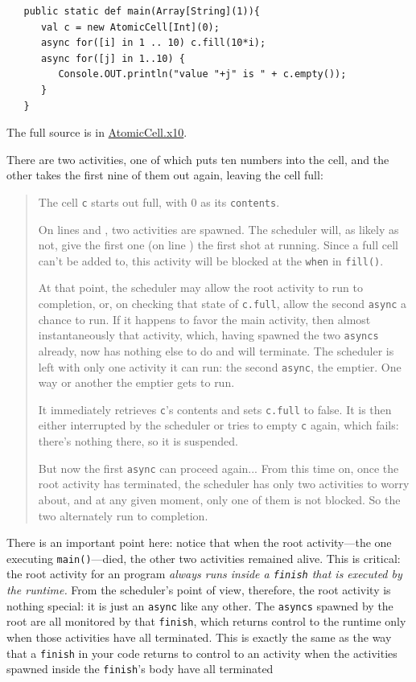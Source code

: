 \begin{verbatim}
   public static def main(Array[String](1)){
      val c = new AtomicCell[Int](0);
      async for([i] in 1 .. 10) c.fill(10*i);
      async for([j] in 1..10) {
         Console.OUT.println("value "+j" is " + c.empty());
      }
   }
\end{verbatim}

The full source is in
\href{src/concurrency/AtomicCell.x10}{AtomicCell.x10}.

There are two activities, one of
which puts ten numbers into the cell, and the other takes the first nine of
them out again, leaving the cell full:

\begin{quote}
The cell {\tt c} starts out full, with 0 as its {\tt contents}.

On lines  and  , two activities
are spawned.  The scheduler will, as likely as not, give the first one
(on line  ) the first shot at running.
Since a full cell can't be added to, this activity will be blocked at the
{\tt when} in {\tt fill()}.  

At that point, the scheduler may allow the root activity to run to completion,
or, on checking that state of {\tt c.full}, allow the second {\tt async}  a chance
to run.   If it happens to favor the main activity, then almost instantaneously
that activity, which, having spawned the two {\tt asyncs} already, now
has nothing else to do and will terminate.
The 
scheduler is left with  only one activity it can run: the second
{\tt async}, the emptier.  One way or another the emptier gets to run.

It  immediately retrieves  {\tt c}'s contents and sets {\tt c.full} to false.
It is then either interrupted by the scheduler or tries to empty {\tt c} again, which
fails: there's nothing there, so it is suspended.

But now the first {\tt async} can proceed again... From this time on,
once the root activity has terminated, the scheduler has only two activities
to worry about, and at any given moment, only one of them is not
blocked.  So the two alternately run to completion.
\end{quote}

There is an important point here: notice that when the root activity---the
one executing {\tt main()}---died, the other two activities remained 
alive.  This is critical: the root activity for an \Xten{} program {\em always
runs inside a {\tt finish} that is executed by the \Xten{} runtime.}  
From the \Xten{} scheduler's point of view, therefore, the root activity is nothing
special: it is just an {\tt async} like any other.    The
{\tt asyncs} spawned by the root are all monitored by that {\tt finish}, which returns
control to the runtime only when those activities have all terminated.  This is 
exactly the same as the
way that a {\tt finish} in your code returns to control to an activity when
the activities spawned inside the {\tt finish}'s body have all terminated

